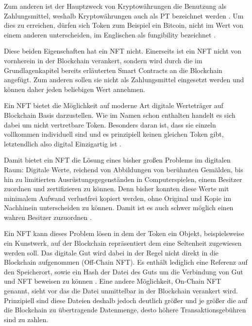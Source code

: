 Zum anderen ist der Hauptzweck von Kryptowährungen die Benutzung als Zahlungsmittel, weshalb Kryptowährungen auch als \ac{PT} bezeichnet werden \parencite[vgl.][924]{Max.2021}.
Um dies zu erreichen, dürfen sich Token zum Beispiel ein Bitcoin, nicht im Wert von einem anderen unterscheiden, im Englischen als fungibility bezeichnet \parencite[vgl.][7]{Fairfield.2021}.

Diese beiden Eigenschaften hat ein \ac{NFT} nicht. Einerseits ist ein \ac{NFT} nicht von vornherein in der Blockchain verankert,
sondern wird durch die im Grundlagenkapitel bereits erläuterten Smart Contracts an die Blockchain angefügt.
Zum anderen sollen sie nicht als Zahlungsmittel eingesetzt werden und können daher jeden beliebigen Wert annehmen.

Ein \ac{NFT} bietet die Möglichkeit auf moderne Art digitale Werteträger auf Blockchain Basis darzustellen.
Wie im Namen schon enthalten handelt es sich dabei um nicht vertretbare Token.
Besonders daran ist, dass sie einzeln vollkommen individuell sind und es prinzipiell keinen gleichen Token gibt,
letztendlich also \dq digital Einzigartig\dq{} ist \parencite[vgl.][13]{Fairfield.2021}. 

Damit bietet ein \ac{NFT} die Lösung eines bisher großen Problems im digitalen Raum:
Digitale Werte, reichend von Abbildungen von berühmten Gemälden, bis hin zu limitierten Ausrüstungsgegenständen in Computerspielen,
einem Besitzer zuordnen und zertifizieren zu können.
Denn bisher konnten diese Werte mit minimalem Aufwand verlustfrei kopiert werden,
ohne Original und Kopie im Nachhinein unterscheiden zu können. Damit ist es auch schwer möglich einen \dq wahren\dq{} Besitzer zuzuordnen \parencite[vgl.][13]{Fairfield.2021}.

Ein \ac{NFT} kann dieses Problem lösen in dem der Token ein Objekt, beispielsweise ein Kunstwerk,
auf der Blockchain repräsentiert dem eine Seltenheit zugewiesen werden soll.
Das digitale Gut wird dabei in der Regel nicht direkt in die Blockchain aufgenommen (Off-Chain \ac{NFT}).
Es enthält lediglich eine Referenz auf den Speicherort,
sowie ein Hash der Datei des Guts um die Verbindung von Gut und \ac{NFT} beweisen zu können \parencite[vgl.][23]{Fairfield.2021}.
Eine andere Möglichkeit, On-Chain \ac{NFT} genannt, sieht vor das die Datei unmittelbar in der Blockchain verankert wird.
Prinzipiell sind diese Dateien deshalb jedoch deutlich größer und je größer die auf die Blockchain zu übertragende Datenmenge,
desto höhere Transaktionsgebühren sind zu zahlen.

